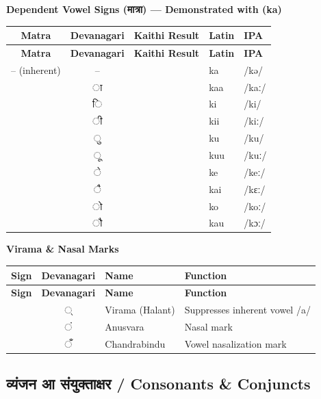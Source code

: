 {\bfseries\small Dependent Vowel Signs (मात्रा) --- Demonstrated with \K{\bka} (ka)}
\begin{longtable}{@{} c c c l l @{}}
\toprule
\textbf{Matra} & \textbf{Devanagari} & \textbf{Kaithi Result} & \textbf{Latin} & \textbf{IPA} \\
\midrule
\endfirsthead
\toprule
\textbf{Matra} & \textbf{Devanagari} & \textbf{Kaithi Result} & \textbf{Latin} & \textbf{IPA} \\
\midrule
\endhead
\bottomrule
\endfoot

-- (inherent) & -- & \K{\bka} & ka & /kə/ \\
\K{\bmaa} & ा & \K{\bka\bmaa} & kaa & /kaː/ \\
\K{\bmi} & ि & \K{\bka\bmi} & ki & /ki/ \\
\K{\bmii} & ी & \K{\bka\bmii} & kii & /kiː/ \\
\K{\bmu} & ु & \K{\bka\bmu} & ku & /ku/ \\
\K{\bmuu} & ू & \K{\bka\bmuu} & kuu & /kuː/ \\
\K{\bme} & े & \K{\bka\bme} & ke & /keː/ \\
\K{\bmai} & ै & \K{\bka\bmai} & kai & /kɛː/ \\
\K{\bmo} & ो & \K{\bka\bmo} & ko & /koː/ \\
\K{\bmau} & ौ & \K{\bka\bmau} & kau & /kɔː/ \\
\bottomrule
\end{longtable}

\vspace{0.3em}

{\bfseries\small Virama \& Nasal Marks}
\begin{longtable}{@{} c c l l @{}}
\toprule
\textbf{Sign} & \textbf{Devanagari} & \textbf{Name} & \textbf{Function} \\
\midrule
\endfirsthead
\toprule
\textbf{Sign} & \textbf{Devanagari} & \textbf{Name} & \textbf{Function} \\
\midrule
\endhead
\bottomrule
\endfoot
\K{\char"25CC\bvir} & ◌् & Virama (Halant) & Suppresses inherent vowel /a/ \\
\K{\banus} & ◌ं & Anusvara & Nasal mark \\
\K{\bchandra} & ◌ँ & Chandrabindu & Vowel nasalization mark \\
\bottomrule
\end{longtable}

\newpage

\subsection*{\color{bpblue}व्यंजन आ संयुक्ताक्षर / Consonants \& Conjuncts}

